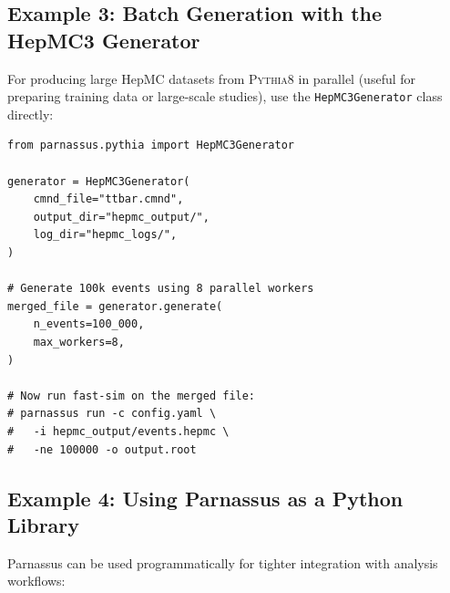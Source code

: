\documentclass[11pt,a4paper]{article}
\begin{document}
\subsection{Example 3: Batch Generation with the HepMC3 Generator}

For producing large HepMC datasets from \textsc{Pythia8} in parallel (useful for
preparing training data or large-scale studies), use the \texttt{HepMC3Generator}
class directly:

\begin{lstlisting}[style=python,caption={Parallel HepMC3 event generation.}]
from parnassus.pythia import HepMC3Generator

generator = HepMC3Generator(
    cmnd_file="ttbar.cmnd",
    output_dir="hepmc_output/",
    log_dir="hepmc_logs/",
)

# Generate 100k events using 8 parallel workers
merged_file = generator.generate(
    n_events=100_000,
    max_workers=8,
)

# Now run fast-sim on the merged file:
# parnassus run -c config.yaml \
#   -i hepmc_output/events.hepmc \
#   -ne 100000 -o output.root
\end{lstlisting}

\subsection{Example 4: Using Parnassus as a Python Library}

Parnassus can be used programmatically for tighter integration with analysis workflows:
\end{document}
